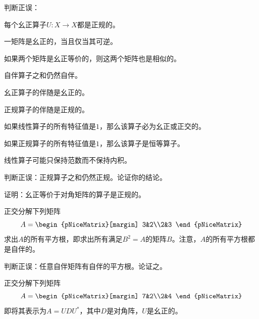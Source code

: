 \begin{problemset}
    \item 判断正误：
    \begin{probenumerate}
        \item 每个幺正算子$U:X\to X$都是正规的。
        \item 一矩阵是幺正的，当且仅当其可逆。
        \item 如果两个矩阵是幺正等价的，则这两个矩阵也是相似的。
        \item 自伴算子之和仍然自伴。
        \item 幺正算子的伴随是幺正的。
        \item 正规算子的伴随是正规的。
        \item 如果线性算子的所有特征值是$1$，那么该算子必为幺正或正交的。
        \item 如果正规算子的所有特征值是$1$，那么该算子是恒等算子。
        \item 线性算子可能只保持范数而不保持内积。
    \end{probenumerate}
    \item 判断正误：正规算子之和仍然正规。论证你的结论。
    \item 证明：幺正等价于对角矩阵的算子是正规的。
    \item 正交分解下列矩阵\[A=\begin{pNiceMatrix}[margin]
        3&2\\2&3
    \end{pNiceMatrix}\]求出$A$的所有平方根，即求出所有满足$B^2=A$的矩阵$B$。注意，$A$的所有平方根都是自伴的。
    \item 判断正误：任意自伴矩阵有自伴的平方根。论证之。
    \item 正交分解下列矩阵\[A=\begin{pNiceMatrix}[margin]
        7&2\\2&4
    \end{pNiceMatrix}\]即将其表示为$A=UDU^*$，其中$D$是对角阵，$U$是幺正的。


\end{problemset}

